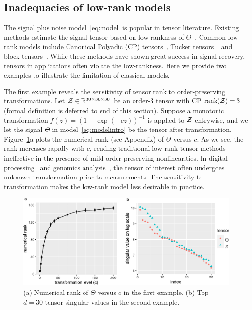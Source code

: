 \documentclass[11pt]{article}
\theoremstyle{plain}
\theoremstyle{definition}
\begin{document}
\subsection{Inadequacies of  low-rank models} The signal plus noise model~\eqref{eq:model} is popular in tensor literature. Existing methods estimate the signal tensor based on low-rankness of $\Theta$~\citep{jain2014provable,montanari2018spectral}. Common low-rank models include Canonical Polyadic (CP) tensors~\citep{hitchcock1927expression}, Tucker tensors~\citep{de2000multilinear}, and block tensors~\citep{wang2019multiway}. While these methods have shown great success in signal recovery, tensors in applications often violate the low-rankness. Here we provide two examples to illustrate the limitation of classical models.


The first example reveals the sensitivity of tensor rank to order-preserving transformations. Let $\mathcal{Z} \in \mathbb{R}^{30\times 30\times 30}$ be an order-3 tensor with CP $\text{rank}(\mathcal{Z})=3$ (formal definition is deferred to end of this section). Suppose a monotonic transformation $f(z)=(1+\exp(-cz))^{-1}$ is applied to $\mathcal{Z}$ entrywise, and we let the signal $\Theta$ in model~\eqref{eq:modelintro} be the tensor after transformation. Figure~\ref{fig:example}a plots the numerical rank (see Appendix) of $\Theta$ versus $c$. As we see, the rank increases rapidly with $c$, rending traditional low-rank tensor methods ineffective in the presence of mild order-preserving nonlinearities. In  digital processing~\citep{ghadermarzy2018learning} and genomics analysis~\citep{hore2016tensor}, the tensor of interest often undergoes unknown transformation prior to measurements. The sensitivity to transformation makes the low-rank model less desirable in practice. 


\begin{figure}[h]
\centering
\includegraphics[width=.8\textwidth]{figure/example_comb.pdf}
\caption{(a) Numerical rank of $\Theta$ versus $c$ in the first example. (b) Top $d=30$ tensor singular values in the second example. }\label{fig:example}
\end{figure}
\end{document}
